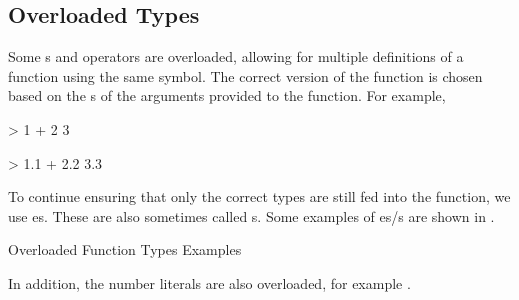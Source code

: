 \subsection{Overloaded Types}\label{subsec:Overloaded_Types}
Some s and operators are overloaded, allowing for multiple definitions of a function using the same symbol.
The correct version of the function is chosen based on the s of the arguments provided to the function.
For example,
\begin{haskellsource}
> 1 + 2
3

> 1.1 + 2.2
3.3
\end{haskellsource}

To continue ensuring that only the correct types are still fed into the function, we use es.
These are also sometimes called s.
Some examples of es/s are shown in .

\begin{listing}[h!tbp]
\caption{Overloaded Function Types Examples}
\label{lst:Overloaded_Types_Examples}
\end{listing}

In addition, the number literals are also overloaded, for example .

